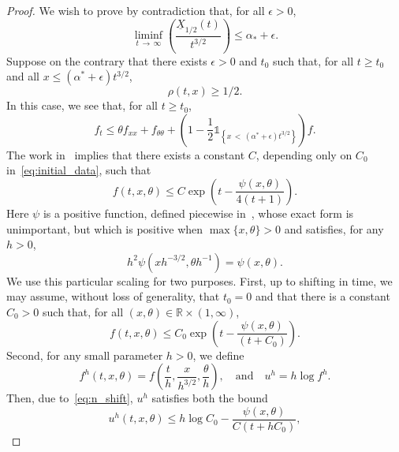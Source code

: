 \documentclass[10pt]{amsart}
\theoremstyle{definition}\newtheorem{defi}[theo]{Definition}\newtheorem{rema}[theo]{Remark}\newtheorem{exam}[theo]{Example}\newtheorem{exem}[theo]{Example}\newtheorem{nota}[theo]{Notation}
\newcommand{\R}{\mathbb{R}}
\newcommand{\1}{\mathds{1}}
\newcommand{\e}{\epsilon}
\begin{document}
\begin{proof}
We wish to prove by contradiction that, for all $\epsilon>0$,
\begin{equation*}
\liminf_{t\,\to\,\infty} \left (\frac{\underline{X}_{1/2}(t)}{t^{3/2}} \right) \leq \alpha_* + \epsilon.
\end{equation*}
Suppose on the contrary that there exists $\epsilon>0$ and $t_0$ such that, for all $t\geq t_0$ and all $x\leq (\alpha^* + \e) t^{3/2}$,
\begin{equation}\label{eq:contradiction_assumption}
\rho(t,x) \geq 1/2.
\end{equation}
In this case, we see that, for all $t \geq t_0$,
\begin{equation}\label{eq:upper_bound_ssoln}
f_t \leq \theta f_{xx} + f_{\theta\theta} + \left(1 - \frac{1}{2}\1_{ \left\{x\,<\,\left(\alpha^*+\e\right)t^{3/2}\right\}} \right)f.
\end{equation}
The work in~\cite[Section~3]{BHR_acceleration} implies that there exists a constant $C$, depending only on $C_0$ in~\eqref{eq:initial_data}, such that
\begin{equation*}
f(t,x,\theta) \leq C \exp\left(t - \frac{\psi(x,\theta)}{4(t + 1)}\right).
\end{equation*}
Here $\psi$ is a positive function, defined piecewise in~\cite[Section~3]{BHR_acceleration}, whose exact form is unimportant, but which is positive when $\max\{x,\theta\} > 0$ and satisfies, for any $h>0$,
\begin{equation*}
h^2 \psi\left(x h^{-3/2}, \theta h^{-1}\right) = \psi(x,\theta).
\end{equation*}
We use this particular scaling for two purposes. First, up to shifting in time, we may assume, without loss of generality, that $t_0 = 0$ and that there is a constant $C_0>0$ such that, for all $(x,\theta) \in \R \times (1,\infty)$,
\begin{equation}\label{eq:n_shift}
f(t,x,\theta) \leq C_0 \exp\left(t - \frac{\psi(x,\theta)}{(t + C_0)} \right).
\end{equation}
Second, for any small parameter $h>0$, we define
\begin{equation}\label{eq:Hopf_Cole}
f^h(t,x,\theta) = f\left (\dfrac t h, \dfrac x{h^{3/2}}, \dfrac \theta h\right),\quad \text{and}\quad u^h = h \log f^h.
\end{equation}
Then, due to~\eqref{eq:n_shift}, $u^h$ satisfies both the bound
\begin{equation}\label{eq:u_0^h}
u^h(t,x,\theta) \leq h \log C_0 - \frac{\psi(x,\theta)}{ C (t+ h C_0)},

\end{equation}
\end{proof}
\end{document}
